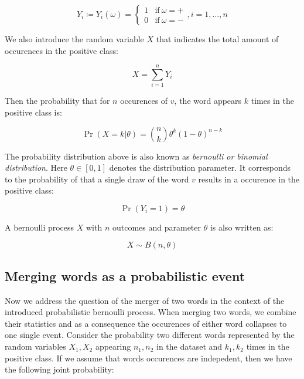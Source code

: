 \begin{equation*}
	Y_i \coloneqq Y_i(\omega) = \begin{cases} 1 & \mathrm{if~} \omega = \mathrm{+}
	\\
	0 & \mathrm{if~} \omega = \mathrm{-} \end{cases}, i = 1,\ldots,n
\end{equation*}

We also introduce the random variable $X$ that indicates the total
amount of occurences in the positive class:

\begin{equation*}
	X = \sum\limits_{i=1}^n Y_i
\end{equation*}

Then the probability that for $n$ occurences of $v$, the word appears $k$ times
in the positive class is: 

\begin{equation*}
	\Pr(X=k|\theta) = \binom{n}{k} \theta^k(1-\theta)^{n-k}
\end{equation*}

The probability distribution above is also known as \emph{bernoulli or binomial
distribution}. Here $\theta \in [0,1]$ denotes the distribution parameter.
It corresponds to the probability of that a single draw of the word $v$ results in
a occurence in the positive class:

\begin{equation*}
	\Pr(Y_i = 1) = \theta
\end{equation*}

A bernoulli process $X$ with $n$ outcomes  
and parameter $\theta$ is also written as:

\begin{equation*}
	X \sim B(n, \theta)
\end{equation*}

\subsection{Merging words as a probabilistic event}

Now we address the question of the merger of two words in the context of the
introduced probabilistic bernoulli process. 
When merging two words, we combine their statistics and as a consequence the
occurences of either word collapses to one single event. 
Consider the probability two different words represented by the random
variables $X_1, X_2$ appearing $n_1, n_2$ in the dataset and $k_1, k_2$ times in
the positive class. If we assume that words occurences are indepedent, then we
have the following joint probability:

